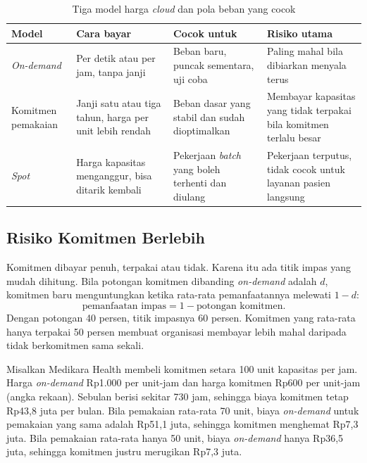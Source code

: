 \begin{table}[!htb]
  \centering
  \caption{Tiga model harga \textit{cloud} dan pola beban yang cocok}
  \label{tab:ch03-model-harga}
  \footnotesize
  \begin{tabularx}{\textwidth}{>{\raggedright\arraybackslash}p{1.9cm} >{\raggedright\arraybackslash}X >{\raggedright\arraybackslash}X >{\raggedright\arraybackslash}X}
    \hline
    \textbf{Model} & \textbf{Cara bayar} & \textbf{Cocok untuk} & \textbf{Risiko utama} \\ \hline
    \textit{On-demand} & Per detik atau per jam, tanpa janji & Beban baru, puncak sementara, uji
      coba & Paling mahal bila dibiarkan menyala terus \\ \hline
    Komitmen pemakaian & Janji satu atau tiga tahun, harga per unit lebih rendah & Beban dasar yang
      stabil dan sudah dioptimalkan & Membayar kapasitas yang tidak terpakai bila komitmen terlalu
      besar \\ \hline
    \textit{Spot} & Harga kapasitas menganggur, bisa ditarik kembali & Pekerjaan \textit{batch} yang
      boleh terhenti dan diulang & Pekerjaan terputus, tidak cocok untuk layanan pasien langsung \\
      \hline
  \end{tabularx}
\end{table}

\subsection{Risiko Komitmen Berlebih}

Komitmen dibayar penuh, terpakai atau tidak. Karena itu ada titik impas yang mudah dihitung. Bila
potongan komitmen dibanding \textit{on-demand} adalah $d$, komitmen baru menguntungkan ketika
rata-rata pemanfaatannya melewati $1 - d$:
\[
  \text{pemanfaatan impas} = 1 - \text{potongan komitmen}.
\]
Dengan potongan 40 persen, titik impasnya 60 persen. Komitmen yang rata-rata hanya terpakai 50
persen membuat organisasi membayar lebih mahal daripada tidak berkomitmen sama sekali.

Misalkan Medikara Health membeli komitmen setara 100 unit kapasitas per jam. Harga
\textit{on-demand} Rp1.000 per unit-jam dan harga komitmen Rp600 per unit-jam (angka rekaan).
Sebulan berisi sekitar 730 jam, sehingga biaya komitmen tetap Rp43,8 juta per bulan. Bila pemakaian
rata-rata 70 unit, biaya \textit{on-demand} untuk pemakaian yang sama adalah Rp51,1 juta, sehingga
komitmen menghemat Rp7,3 juta. Bila pemakaian rata-rata hanya 50 unit, biaya \textit{on-demand}
hanya Rp36,5 juta, sehingga komitmen justru merugikan Rp7,3 juta.


